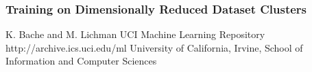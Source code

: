 \documentclass{sig-alternate}
\begin{document}
\subsubsection{Training on Dimensionally Reduced Dataset Clusters}







\begin{thebibliography}{10}

K. Bache and M. Lichman
\newblock UCI Machine Learning Repository
\newblock http://archive.ics.uci.edu/ml
\newblock University of California, Irvine, School of Information and Computer Sciences


\end{thebibliography}
\end{document}
